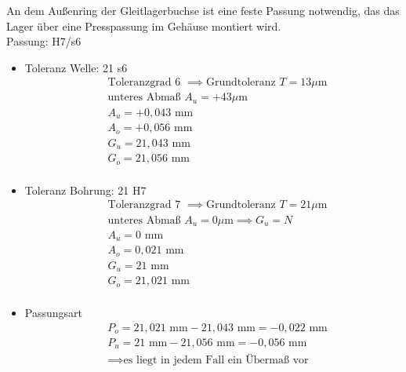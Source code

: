An dem Außenring der Gleitlagerbuchse ist eine feste Passung notwendig, das das Lager über eine Presspassung im Gehäuse montiert wird. \\ 
Passung: H7/s6
\begin{itemize}
	\item Toleranz Welle: 21 s6
	\begin{align*}
	&\text{Toleranzgrad 6 } \implies \text{Grundtoleranz } T=13 \mu\text{m} \\
	&\text{unteres Abmaß } A_u = +43\mu\text{m} \\
	&A_u = +0,043 \text{ mm} \\
	&A_o = +0,056 \text{ mm} \\
	&G_u = 21,043 \text{ mm} \\
	&G_o = 21,056 \text{ mm}\\
	\end{align*} 
	\item Toleranz Bohrung: 21 H7
	\begin{align*}
	&\text{Toleranzgrad 7 } \implies \text{Grundtoleranz } T=21 \mu\text{m} \\
	&\text{unteres Abmaß } A_u = 0 \mu\text{m} \implies G_u = N\\
	&A_u = 0 \text{ mm} \\
	&A_o = 0,021 \text{ mm} \\
	&G_u = 21 \text{ mm} \\
	&G_o = 21,021 \text{ mm}\\
	\end{align*} 
	\item Passungsart
	\begin{align*}
	&P_o = 21,021 \text{ mm} - 21,043 \text{ mm} = -0,022 \text{ mm} \\
	&P_u = 21 \text{ mm} - 21,056 \text{ mm} = -0,056 \text{ mm}\\
	&\implies \text{es liegt in jedem Fall ein Übermaß vor}
	\end{align*} 
\end{itemize}
